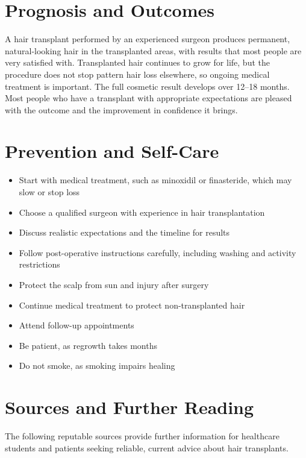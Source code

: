 \section*{Prognosis and Outcomes}
A hair transplant performed by an experienced surgeon produces permanent, natural-looking hair in the transplanted areas, with results that most people are very satisfied with. Transplanted hair continues to grow for life, but the procedure does not stop pattern hair loss elsewhere, so ongoing medical treatment is important. The full cosmetic result develops over 12--18 months. Most people who have a transplant with appropriate expectations are pleased with the outcome and the improvement in confidence it brings.

\section*{Prevention and Self-Care}
\begin{itemize}
    \item Start with medical treatment, such as minoxidil or finasteride, which may slow or stop loss
    \item Choose a qualified surgeon with experience in hair transplantation
    \item Discuss realistic expectations and the timeline for results
    \item Follow post-operative instructions carefully, including washing and activity restrictions
    \item Protect the scalp from sun and injury after surgery
    \item Continue medical treatment to protect non-transplanted hair
    \item Attend follow-up appointments
    \item Be patient, as regrowth takes months
    \item Do not smoke, as smoking impairs healing
\end{itemize}

\section*{Sources and Further Reading}
The following reputable sources provide further information for healthcare students and patients seeking reliable, current advice about hair transplants.

